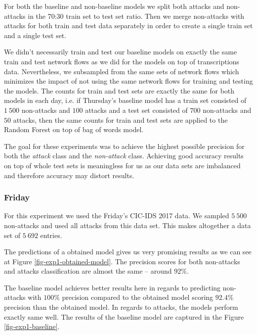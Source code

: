 \documentclass{article}
\begin{document}
For both the baseline and non-baseline models we split both attacks and non-attacks in the 70:30 train set to test set ratio. Then we merge non-attacks with attacks for both train and test data separately in order to create a single train set and a single test set.

We didn't necessarily train and test our baseline models on exactly the same train and test network flows as we did for the models on top of transcriptions data. Nevertheless, we subsampled from the same sets of network flows which minimizes the impact of not using the same network flows for training and testing the models. The counts for train and test sets are exactly the same for both models in each day, i.e. if Thursday's baseline model has a train set consisted of $1\ 500$ non-attacks and $100$ attacks and a test set consisted of $700$ non-attacks and $50$ attacks, then the same counts for train and test sets are applied to the Random Forest on top of bag of words model.

The goal for these experiments was to achieve the highest possible precision for both the \textit{attack} class and the \textit{non-attack} class. Achieving good accuracy results on top of whole test sets is meaningless for us as our data sets are imbalanced and therefore accuracy may distort results.



\clearpage

\subsubsection{Friday}

For this experiment we used the Friday's CIC-IDS 2017 data. We sampled $5\ 500$ non-attacks and used all attacks from this data set. This makes altogether a data set of $5\ 692$ entries.

The predictions of a obtained model gives us very promising results as we can see at Figure \ref{fig-exp1-obtained-model}. The precision scores for both non-attacks and attacks classification are almost the same -- around $92\%$.

The baseline model achieves better results here in regards to predicting non-attacks with $100\%$ precision compared to the obtained model scoring $92.4\%$ precision than the obtained model. In regards to attacks, the models perform exactly same well. The results of the baseline model are captured in the Figure \ref{fig-exp1-baseline}.
\end{document}
